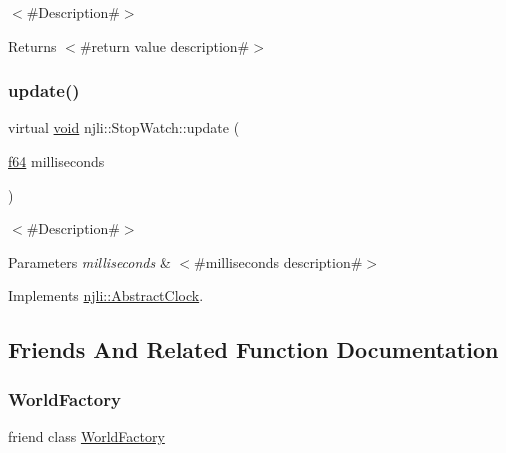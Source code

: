 $<$\#\+Description\#$>$

\begin{DoxyReturn}{Returns}
$<$\#return value description\#$>$ 
\end{DoxyReturn}
\mbox{\label{classnjli_1_1_stop_watch_a0ab1925582a66c67c1db0bf9f731f4cc}} 
\subsubsection{\texorpdfstring{update()}{update()}}
{\footnotesize\ttfamily virtual \mbox{\hyperlink{_thread_8h_af1e856da2e658414cb2456cb6f7ebc66}{void}} njli\+::\+Stop\+Watch\+::update (\begin{DoxyParamCaption}\item[{\mbox{\hyperlink{_util_8h_a94dab5770726ccbef8c7d026cfbdf8e5}{f64}}}]{milliseconds }\end{DoxyParamCaption})\hspace{0.3cm}{\ttfamily [virtual]}}

$<$\#\+Description\#$>$


\begin{DoxyParams}{Parameters}
{\em milliseconds} & $<$\#milliseconds description\#$>$ \\
\hline
\end{DoxyParams}


Implements \mbox{\hyperlink{classnjli_1_1_abstract_clock_a06401048780f7b9522187731d3a97579}{njli\+::\+Abstract\+Clock}}.



\subsection{Friends And Related Function Documentation}
\mbox{\label{classnjli_1_1_stop_watch_acb96ebb09abe8f2a37a915a842babfac}} 
\subsubsection{\texorpdfstring{World\+Factory}{WorldFactory}}
{\footnotesize\ttfamily friend class \mbox{\hyperlink{classnjli_1_1_world_factory}{World\+Factory}}\hspace{0.3cm}{\ttfamily [friend]}}



